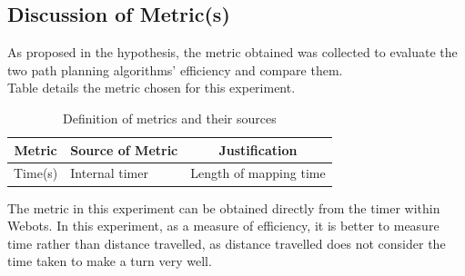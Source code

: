 \documentclass[conference]{IEEEtran}
\begin{document}
\subsection{Discussion of Metric(s)}
As proposed in the hypothesis, the metric obtained was collected to evaluate the two path planning algorithms' efficiency and compare them. \\
Table \uppercase\expandafter{} details the metric chosen for this experiment.

\begin{table}[htbp]
\centering
\caption{Definition of metrics and their sources}
\label{Table1}
\begin{tabular}{c|l|c}
\hline
Metric                & \multicolumn{1}{c|}{Source of Metric} & Justification     \\ \hline
Time(s)               & Internal timer            & Length of mapping time \\ \hline
\end{tabular}
\end{table}

The metric in this experiment can be obtained directly from the timer within Webots. In this experiment, as a measure of efficiency, it is better to measure time rather than distance travelled, as distance travelled does not consider the time taken to make a turn very well. 
\end{document}
